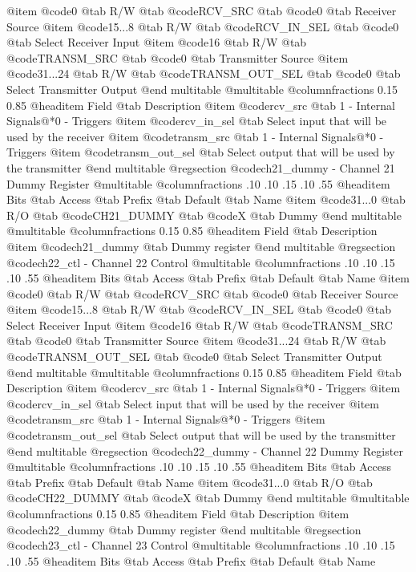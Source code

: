 @item @code{0}
@tab R/W @tab
@code{RCV_SRC}
@tab @code{0} @tab 
Receiver Source
@item @code{15...8}
@tab R/W @tab
@code{RCV_IN_SEL}
@tab @code{0} @tab 
Select Receiver Input
@item @code{16}
@tab R/W @tab
@code{TRANSM_SRC}
@tab @code{0} @tab 
Transmitter Source
@item @code{31...24}
@tab R/W @tab
@code{TRANSM_OUT_SEL}
@tab @code{0} @tab 
Select Transmitter Output
@end multitable
@multitable @columnfractions 0.15 0.85
@headitem Field @tab Description
@item @code{rcv_src} @tab 1 - Internal Signals@*0 - Triggers
@item @code{rcv_in_sel} @tab Select input that will be used by the receiver
@item @code{transm_src} @tab 1 - Internal Signals@*0 - Triggers
@item @code{transm_out_sel} @tab Select output that will be used by the transmitter
@end multitable
@regsection @code{ch21_dummy} - Channel 21 Dummy Register
@multitable @columnfractions .10 .10 .15 .10 .55
@headitem Bits @tab Access @tab Prefix @tab Default @tab Name
@item @code{31...0}
@tab R/O @tab
@code{CH21_DUMMY}
@tab @code{X} @tab 
Dummy
@end multitable
@multitable @columnfractions 0.15 0.85
@headitem Field @tab Description
@item @code{ch21_dummy} @tab Dummy register
@end multitable
@regsection @code{ch22_ctl} - Channel 22 Control
@multitable @columnfractions .10 .10 .15 .10 .55
@headitem Bits @tab Access @tab Prefix @tab Default @tab Name
@item @code{0}
@tab R/W @tab
@code{RCV_SRC}
@tab @code{0} @tab 
Receiver Source
@item @code{15...8}
@tab R/W @tab
@code{RCV_IN_SEL}
@tab @code{0} @tab 
Select Receiver Input
@item @code{16}
@tab R/W @tab
@code{TRANSM_SRC}
@tab @code{0} @tab 
Transmitter Source
@item @code{31...24}
@tab R/W @tab
@code{TRANSM_OUT_SEL}
@tab @code{0} @tab 
Select Transmitter Output
@end multitable
@multitable @columnfractions 0.15 0.85
@headitem Field @tab Description
@item @code{rcv_src} @tab 1 - Internal Signals@*0 - Triggers
@item @code{rcv_in_sel} @tab Select input that will be used by the receiver
@item @code{transm_src} @tab 1 - Internal Signals@*0 - Triggers
@item @code{transm_out_sel} @tab Select output that will be used by the transmitter
@end multitable
@regsection @code{ch22_dummy} - Channel 22 Dummy Register
@multitable @columnfractions .10 .10 .15 .10 .55
@headitem Bits @tab Access @tab Prefix @tab Default @tab Name
@item @code{31...0}
@tab R/O @tab
@code{CH22_DUMMY}
@tab @code{X} @tab 
Dummy
@end multitable
@multitable @columnfractions 0.15 0.85
@headitem Field @tab Description
@item @code{ch22_dummy} @tab Dummy register
@end multitable
@regsection @code{ch23_ctl} - Channel 23 Control
@multitable @columnfractions .10 .10 .15 .10 .55
@headitem Bits @tab Access @tab Prefix @tab Default @tab Name
